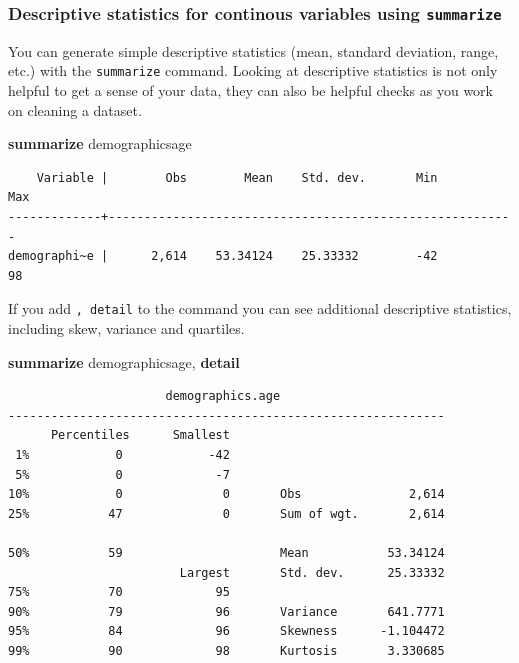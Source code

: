 \documentclass[
]{book}
\newenvironment{Shaded}{\begin{snugshade}}{\end{snugshade}}
\newcommand{\KeywordTok}[1]{\textcolor[rgb]{0.13,0.29,0.53}{\textbf{#1}}}
\newcommand{\NormalTok}[1]{#1}
\begin{document}
\hypertarget{summarize}{%
\subsubsection*{\texorpdfstring{Descriptive statistics for continous variables using \texttt{summarize}}{Descriptive statistics for continous variables using summarize}}\label{summarize}}

You can generate simple descriptive statistics (mean, standard deviation, range, etc.) with the \texttt{summarize} command. Looking at descriptive statistics is not only helpful to get a sense of your data, they can also be helpful checks as you work on cleaning a dataset.

\begin{Shaded}
\begin{Highlighting}[]
\KeywordTok{summarize}\NormalTok{ demographicsage}
\end{Highlighting}
\end{Shaded}

\begin{verbatim}
    Variable |        Obs        Mean    Std. dev.       Min        Max
-------------+---------------------------------------------------------
demographi~e |      2,614    53.34124    25.33332        -42         98
\end{verbatim}

If you add \texttt{,\ detail} to the command you can see additional descriptive statistics,
including skew, variance and quartiles.

\begin{Shaded}
\begin{Highlighting}[]
\KeywordTok{summarize}\NormalTok{ demographicsage, }\KeywordTok{detail}
\end{Highlighting}
\end{Shaded}

\begin{verbatim}
                      demographics.age
-------------------------------------------------------------
      Percentiles      Smallest
 1%            0            -42
 5%            0             -7
10%            0              0       Obs               2,614
25%           47              0       Sum of wgt.       2,614

50%           59                      Mean           53.34124
                        Largest       Std. dev.      25.33332
75%           70             95
90%           79             96       Variance       641.7771
95%           84             96       Skewness      -1.104472
99%           90             98       Kurtosis       3.330685
\end{verbatim}
\end{document}
